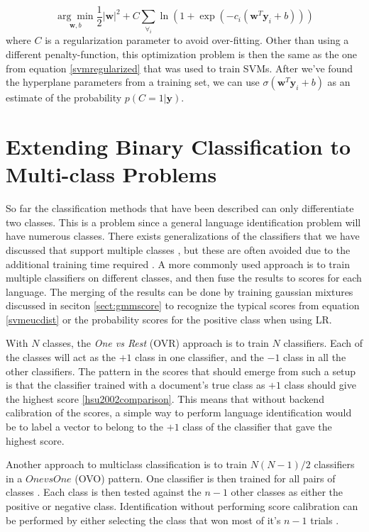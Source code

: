 \begin{equation}
\label{logisticreg}
\underset{\mathbf{w}, b}{\arg \min} \frac{1}{2}|\mathbf{w}|^2+C\sum_{\forall_i} \ln(1+\exp(-c_i(\mathbf{w}^T\mathbf{y}_i+b)))
\end{equation}
where $C$ is a regularization parameter to avoid over-fitting. Other than using a different penalty-function, this optimization problem is then the same as the one from equation \ref{svmregularized} that was used to train SVMs. After we've found the hyperplane parameters from a training set, we can use $\sigma(\mathbf{w}^T\mathbf{y}_i+b)$ as an estimate of the probability $p(C=1|\mathbf{y})$.

\section{Extending Binary Classification to Multi-class Problems}
\label{sect:multiclass}

So far the classification methods that have been described can only differentiate two classes. This is a problem since a general language identification problem will have numerous classes. There exists generalizations of the classifiers that we have discussed that support multiple classes \cite[p. 209]{machinelearningbook,hsu2002comparison}, but these are often avoided due to the additional training time required \cite{hsu2002comparison}. A more commonly used approach is to train multiple classifiers on different classes, and then fuse the results to scores for each language. The merging of the results can be done by training gaussian mixtures discussed in seciton \ref{sect:gmmscore} to recognize the typical scores from equation \ref{svmeucdist} or the probability scores for the positive class when using LR.

With $N$ classes, the \emph{One vs Rest} (OVR) approach is to train $N$ classifiers. Each of the classes will act as the $+1$ class in one classifier, and the $-1$ class in all the other classifiers. The pattern in the scores that should emerge from such a setup is that the classifier trained with a document's true class as $+1$ class should give the highest score \ref{hsu2002comparison}. This means that without backend calibration of the scores, a simple way to perform language identification would be to label a vector to belong to the $+1$ class of the classifier that gave the highest score.

Another approach to multiclass classification is to train $N(N-1)/2$ classifiers in a $One vs One$ (OVO) pattern. One classifier is then trained for all pairs of classes \cite{hsu2002comparison}. Each class is then tested against the $n-1$ other classes as either the positive or negative class. Identification without performing score calibration can be performed by either selecting the class that won most of it's $n-1$ trials \cite{hsu2002comparison}.

